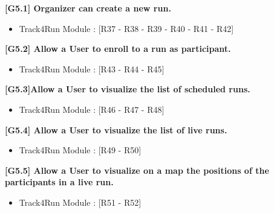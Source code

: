 \textbf{[G5.1] Organizer can create a new run.}
\begin{itemize}
	\item Track4Run Module : [R37 - R38 - R39 - R40 - R41 - R42]
\end{itemize}

\textbf{[G5.2] Allow a User to enroll to a run as participant.}
\begin{itemize}
	\item Track4Run Module : [R43 - R44 - R45]
\end{itemize}

\textbf{[G5.3]Allow a User to visualize the list of scheduled runs.}
\begin{itemize}
	\item Track4Run Module : [R46 - R47 - R48]
\end{itemize}

\textbf{[G5.4] Allow a User to visualize the list of live runs.}
\begin{itemize}
	\item Track4Run Module : [R49 - R50]
\end{itemize}

\textbf{[G5.5] Allow a User to visualize on a map the positions of the participants
in a live run.}
\begin{itemize}
	\item Track4Run Module : [R51 - R52]
\end{itemize}
